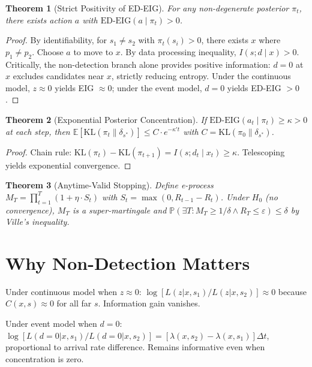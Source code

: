 \documentclass[11pt]{article}
\newtheorem{theorem}{Theorem}
\begin{document}
\begin{theorem}[Strict Positivity of ED-EIG]
For any non-degenerate posterior $\pi_t$, there exists action $a$ with $\mathrm{ED\text{-}EIG}(a \mid \pi_t) > 0$.
\end{theorem}

\begin{proof}
By identifiability, for $s_1 \neq s_2$ with $\pi_t(s_i) > 0$, there exists $x$ where $p_1 \neq p_2$. Choose $a$ to move to $x$. By data processing inequality, $I(s; d \mid x) > 0$. Critically, the non-detection branch alone provides positive information: $d=0$ at $x$ excludes candidates near $x$, strictly reducing entropy. Under the continuous model, $z \approx 0$ yields EIG $\approx 0$; under the event model, $d = 0$ yields ED-EIG $> 0$.
\end{proof}

\begin{theorem}[Exponential Posterior Concentration]
If $\mathrm{ED\text{-}EIG}(a_t \mid \pi_t) \geq \kappa > 0$ at each step, then $\mathbb{E}[\mathrm{KL}(\pi_t \| \delta_{s^*})] \leq C \cdot e^{-\kappa' t}$ with $C = \mathrm{KL}(\pi_0 \| \delta_{s^*})$.
\end{theorem}

\begin{proof}
Chain rule: $\mathrm{KL}(\pi_t) - \mathrm{KL}(\pi_{t+1}) = I(s; d_t \mid x_t) \geq \kappa$. Telescoping yields exponential convergence.
\end{proof}

\begin{theorem}[Anytime-Valid Stopping]
Define e-process $M_T = \prod_{t=1}^T (1 + \eta \cdot S_t)$ with $S_t = \max(0, R_{t-1} - R_t)$. Under $H_0$ (no convergence), $M_T$ is a super-martingale and $\mathbb{P}(\exists T: M_T \geq 1/\delta \wedge R_T \leq \varepsilon) \leq \delta$ by Ville's inequality.
\end{theorem}

\section{Why Non-Detection Matters}
Under continuous model when $z \approx 0$: $\log[L(z|x,s_1)/L(z|x,s_2)] \approx 0$ because $C(x,s) \approx 0$ for all far $s$. Information gain vanishes.

Under event model when $d = 0$: $\log[L(d\!=\!0|x,s_1)/L(d\!=\!0|x,s_2)] = [\lambda(x,s_2) - \lambda(x,s_1)] \Delta t$, proportional to arrival rate difference. Remains informative even when concentration is zero.
\end{document}
